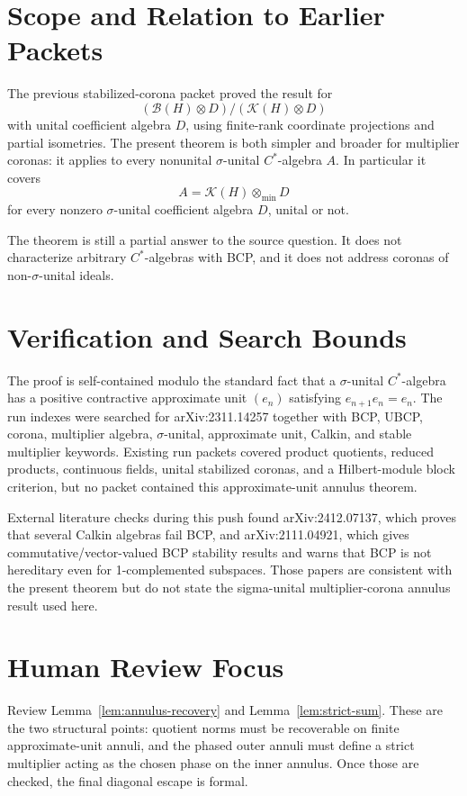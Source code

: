 \documentclass[11pt]{article}
\newcommand{\K}{\mathcal K}
\newcommand{\B}{\mathcal B}
\begin{document}
\section*{Scope and Relation to Earlier Packets}

The previous stabilized-corona packet proved the result for
\[
        (\B(H)\otimes D)/(\K(H)\otimes D)
\]
with unital coefficient algebra \(D\), using finite-rank coordinate
projections and partial isometries.  The present theorem is both simpler and
broader for multiplier coronas: it applies to every nonunital
\(\sigma\)-unital \(C^*\)-algebra \(A\).  In particular it covers
\[
        A=\K(H)\otimes_{\min}D
\]
for every nonzero \(\sigma\)-unital coefficient algebra \(D\), unital or not.

The theorem is still a partial answer to the source question.  It does not
characterize arbitrary \(C^*\)-algebras with BCP, and it does not address
coronas of non-\(\sigma\)-unital ideals.

\section*{Verification and Search Bounds}

The proof is self-contained modulo the standard fact that a \(\sigma\)-unital
\(C^*\)-algebra has a positive contractive approximate unit
\((e_n)\) satisfying \(e_{n+1}e_n=e_n\).  The run indexes were searched for
arXiv:2311.14257 together with BCP, UBCP, corona, multiplier algebra,
\(\sigma\)-unital, approximate unit, Calkin, and stable multiplier keywords.
Existing run packets covered product quotients, reduced products, continuous
fields, unital stabilized coronas, and a Hilbert-module block criterion, but
no packet contained this approximate-unit annulus theorem.

External literature checks during this push found arXiv:2412.07137, which
proves that several Calkin algebras fail BCP, and arXiv:2111.04921, which
gives commutative/vector-valued BCP stability results and warns that BCP is
not hereditary even for 1-complemented subspaces.  Those papers are consistent
with the present theorem but do not state the sigma-unital multiplier-corona
annulus result used here.

\section*{Human Review Focus}

Review Lemma~\ref{lem:annulus-recovery} and Lemma~\ref{lem:strict-sum}.
These are the two structural points: quotient norms must be recoverable on
finite approximate-unit annuli, and the phased outer annuli must define a
strict multiplier acting as the chosen phase on the inner annulus.  Once those
are checked, the final diagonal escape is formal.
\end{document}
